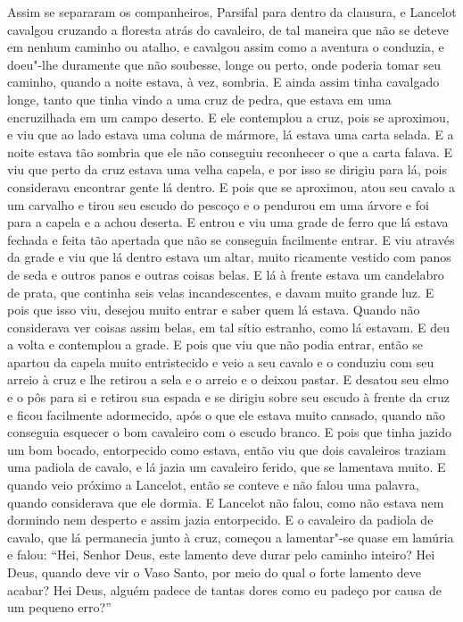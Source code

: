 Assim se separaram os companheiros, Parsifal para dentro da clausura, e
Lancelot cavalgou cruzando a floresta atrás do cavaleiro, de tal maneira que
não se deteve em nenhum caminho ou atalho, e cavalgou assim como a aventura o
conduzia, e doeu"-lhe duramente que não soubesse, longe ou perto, onde poderia
tomar seu caminho, quando a noite estava, à vez, sombria. E ainda assim tinha
cavalgado longe, tanto que tinha vindo a uma cruz de pedra, que estava em uma
encruzilhada em um campo deserto. E ele contemplou a cruz, pois se aproximou, e
viu que ao lado estava uma coluna de mármore, lá estava uma carta selada. E a
noite estava tão sombria que ele não conseguiu reconhecer o que a carta falava.
E viu que perto da cruz estava uma velha capela, e por isso se dirigiu para lá,
pois considerava encontrar gente lá dentro. E pois que se aproximou, atou seu
cavalo a um carvalho e tirou seu escudo do pescoço e o pendurou em uma árvore e
foi para a capela e a achou deserta. E entrou e viu uma grade de ferro que lá
estava fechada e feita tão apertada que não se conseguia facilmente entrar. E
viu através da grade e viu que lá dentro estava um altar, muito ricamente
vestido com panos de seda e outros panos e outras coisas belas. E lá à frente
estava um candelabro de prata, que continha seis velas incandescentes, e davam
muito grande luz. E pois que isso viu, desejou muito entrar e saber quem lá
estava. Quando não considerava ver coisas assim belas, em tal sítio estranho,
como lá estavam. E deu a volta e contemplou a grade. E pois que viu que não
podia entrar, então se apartou da capela muito entristecido e veio a seu cavalo
e o conduziu com seu arreio à cruz e lhe retirou a sela e o arreio e o deixou
pastar. E desatou seu elmo e o pôs para si e retirou sua espada e se dirigiu
sobre seu escudo à frente da cruz e ficou facilmente adormecido, após o que ele
estava muito cansado, quando não conseguia esquecer o bom cavaleiro com o
escudo branco. E pois que tinha jazido um bom bocado, entorpecido como estava,
então viu que dois cavaleiros traziam uma padiola de cavalo, e lá jazia um
cavaleiro ferido, que se lamentava muito. E quando veio próximo a Lancelot,
então se conteve e não falou uma palavra, quando considerava que ele dormia. E
Lancelot não falou, como não estava nem dormindo nem desperto e assim jazia
entorpecido. E o cavaleiro da padiola de cavalo, que lá permanecia junto à
cruz, começou a lamentar"-se quase em lamúria e falou: “Hei, Senhor Deus, este
lamento deve durar pelo caminho inteiro? Hei Deus, quando deve vir o Vaso
Santo, por meio do qual o forte lamento deve acabar? Hei Deus, alguém padece de
tantas dores como eu padeço por causa de um pequeno erro?”

